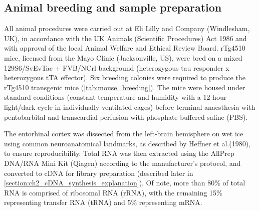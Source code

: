 \subsection{Animal breeding and sample preparation}
\label{sec: animalbreeding_sample preparation}
All animal procedures were carried out at Eli Lilly and Company (Windlesham, UK), in accordance with the UK Animals (Scientific Procedures) Act 1986 and with approval of the local Animal Welfare and Ethical Review Board. rTg4510 mice, licensed from the Mayo Clinic (Jacksonville, US), were bred on a mixed 129S6/SvEvTac + FVB/NCrl background (heterozygous tau responder x heterozygous tTA effector)\cite{Castanho2020}. Six breeding colonies were required to produce the rTg4510 transgenic mice (\cref{tab:mouse_breeding}). The mice were housed under standard conditions (constant temperature and humidity with a 12-hour light/dark cycle in individually ventilated cages) before terminal anaesthesia with pentobarbital and transcardial perfusion with phosphate-buffered saline (PBS)\cite{Castanho2020}.

The entorhinal cortex was dissected from the left-brain hemisphere on wet ice using common neuroanatomical landmarks, as described by Heffner et al.(1980)\cite{Heffner1980}, to ensure reproducibility. Total RNA was then extracted\cite{Castanho2020} using the AllPrep DNA/RNA Mini Kit (Qiagen) according to the manufacturer's protocol, and converted to cDNA for library preparation (described later in \cref{section:ch2_cDNA_synthesis_explanation}). Of note, more than 80\% of total RNA is comprised of ribosomal RNA (rRNA), with the remaining 15\% representing transfer RNA (tRNA) and 5\% representing mRNA. 


